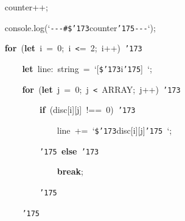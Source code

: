 \documentclass[a4paper,10pt]{article}
\def\mc{\relax}
\begin{document}
\noindent
\mbox{}{\tt\mc \ }{\tt\mc \ }{\tt\mc \ }{\tt\mc \ }counter++;

\noindent
\mbox{}{\tt\mc \ }{\tt\mc \ }{\tt\mc \ }{\tt\mc \ }console.log(`{\tt -}{\tt -}{\tt -}{\tt\#}{\tt\$}{\tt\char'173}counter{\tt\char'175}{\tt -}{\tt -}{\tt -}`);

\noindent
\mbox{}{\tt\mc \ }{\tt\mc \ }{\tt\mc \ }{\tt\mc \ }\textbf{for}{\tt\mc \ }(\textbf{let}{\tt\mc \ }i{\tt\mc \ }={\tt\mc \ }0;{\tt\mc \ }i{\tt\mc \ }{\tt <}={\tt\mc \ }2;{\tt\mc \ }i++){\tt\mc \ }{\tt\char'173}

\noindent
\mbox{}{\tt\mc \ }{\tt\mc \ }{\tt\mc \ }{\tt\mc \ }{\tt\mc \ }{\tt\mc \ }{\tt\mc \ }{\tt\mc \ }\textbf{let}{\tt\mc \ }line:{\tt\mc \ }string{\tt\mc \ }={\tt\mc \ }`[{\tt\$}{\tt\char'173}i{\tt\char'175}]{\tt\mc \ }`;

\noindent
\mbox{}{\tt\mc \ }{\tt\mc \ }{\tt\mc \ }{\tt\mc \ }{\tt\mc \ }{\tt\mc \ }{\tt\mc \ }{\tt\mc \ }\textbf{for}{\tt\mc \ }(\textbf{let}{\tt\mc \ }j{\tt\mc \ }={\tt\mc \ }0;{\tt\mc \ }j{\tt\mc \ }{\tt <}{\tt\mc \ }ARRAY;{\tt\mc \ }j++){\tt\mc \ }{\tt\char'173}

\noindent
\mbox{}{\tt\mc \ }{\tt\mc \ }{\tt\mc \ }{\tt\mc \ }{\tt\mc \ }{\tt\mc \ }{\tt\mc \ }{\tt\mc \ }{\tt\mc \ }{\tt\mc \ }{\tt\mc \ }{\tt\mc \ }\textbf{if}{\tt\mc \ }(disc[i][j]{\tt\mc \ }!=={\tt\mc \ }0){\tt\mc \ }{\tt\char'173}

\noindent
\mbox{}{\tt\mc \ }{\tt\mc \ }{\tt\mc \ }{\tt\mc \ }{\tt\mc \ }{\tt\mc \ }{\tt\mc \ }{\tt\mc \ }{\tt\mc \ }{\tt\mc \ }{\tt\mc \ }{\tt\mc \ }{\tt\mc \ }{\tt\mc \ }{\tt\mc \ }{\tt\mc \ }line{\tt\mc \ }+={\tt\mc \ }`{\tt\$}{\tt\char'173}disc[i][j]{\tt\char'175}{\tt\mc \ }`;

\noindent
\mbox{}{\tt\mc \ }{\tt\mc \ }{\tt\mc \ }{\tt\mc \ }{\tt\mc \ }{\tt\mc \ }{\tt\mc \ }{\tt\mc \ }{\tt\mc \ }{\tt\mc \ }{\tt\mc \ }{\tt\mc \ }{\tt\char'175}{\tt\mc \ }\textbf{else}{\tt\mc \ }{\tt\char'173}

\noindent
\mbox{}{\tt\mc \ }{\tt\mc \ }{\tt\mc \ }{\tt\mc \ }{\tt\mc \ }{\tt\mc \ }{\tt\mc \ }{\tt\mc \ }{\tt\mc \ }{\tt\mc \ }{\tt\mc \ }{\tt\mc \ }{\tt\mc \ }{\tt\mc \ }{\tt\mc \ }{\tt\mc \ }\textbf{break};

\noindent
\mbox{}{\tt\mc \ }{\tt\mc \ }{\tt\mc \ }{\tt\mc \ }{\tt\mc \ }{\tt\mc \ }{\tt\mc \ }{\tt\mc \ }{\tt\mc \ }{\tt\mc \ }{\tt\mc \ }{\tt\mc \ }{\tt\char'175}

\noindent
\mbox{}{\tt\mc \ }{\tt\mc \ }{\tt\mc \ }{\tt\mc \ }{\tt\mc \ }{\tt\mc \ }{\tt\mc \ }{\tt\mc \ }{\tt\char'175}
\end{document}
